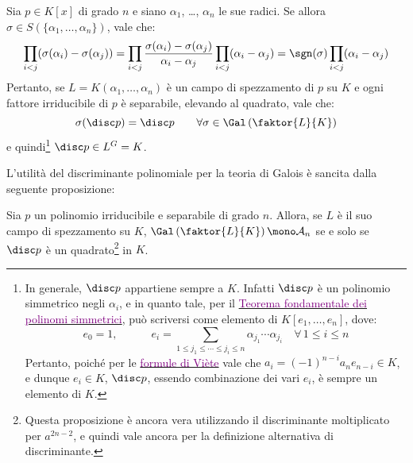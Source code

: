 \documentclass[11pt]{scrartcl}
\begin{document}
	\begin{remark}
		Sia $p \in K[x]$ di grado $n$ e siano $\alpha_1$, \ldots, $\alpha_n$ le sue radici.
		Se allora $\sigma \in S(\{\alpha_1, \ldots, \alpha_n\})$, vale che:
		\[ \prod_{i < j} (\sigma(\alpha_i) - \sigma(\alpha_j)) = \prod_{i < j} \frac{\sigma(\alpha_i) - \sigma(\alpha_j)}{\alpha_i - \alpha_j} \prod_{i < j} (\alpha_i - \alpha_j) = \sgn(\sigma) \prod_{i < j} (\alpha_i - \alpha_j)  \]
		Pertanto, se $L = K(\alpha_1, \ldots, \alpha_n)$ è un campo di spezzamento di $p$ su $K$ e
		ogni fattore irriducibile di $p$ è separabile,
		elevando al quadrato, vale che:
		\[ \sigma(\disc p) = \disc p \qquad \forall \sigma \in \Gal\left(\faktor{L}{K}\right) \]
		e quindi\footnote{
			In generale, $\disc p$ appartiene sempre a $K$. Infatti $\disc p$ è un polinomio
			simmetrico negli $\alpha_i$, e in quanto tale, per il \href{https://it.wikipedia.org/wiki/Polinomio_simmetrico\#Teorema_fondamentale_per_i_polinomi_simmetrici}{\textcolor{purple}{Teorema fondamentale dei polinomi simmetrici}}, può scriversi come elemento di $K[e_1, \ldots, e_n]$, dove:
			\[ e_0 = 1, \quad\qquad e_i = \sum_{1 \leq j_1  \leq \cdots \leq j_i \leq n } \alpha_{j_1} \cdots \alpha_{j_i} \quad \forall \, 1 \leq i \leq n \]
			Pertanto, poiché per le \href{https://it.wikipedia.org/wiki/Formule_di_Vi\%C3\%A8te}{\textcolor{purple}{formule di Viète}} vale che $a_i = (-1)^{n-i} a_n e_{n-i} \in K$, e dunque $e_i \in K$, $\disc p$, essendo combinazione dei vari $e_i$, è sempre un elemento di $K$.
		} $\disc p \in L^G = K$.
	\end{remark}
	
	L'utilità del discriminante polinomiale per la teoria di Galois è sancita dalla
	seguente proposizione:
	
	\begin{proposition}
		Sia $p$ un polinomio irriducibile e separabile di grado $n$. Allora, se $L$ è il suo
		campo di spezzamento su $K$, $\Gal\left(\faktor{L}{K}\right) \mono \mathcal{A}_n$ se e
		solo se $\disc p$ è un quadrato\footnote{
			Questa proposizione è ancora vera utilizzando il discriminante moltiplicato
			per $a^{2n-2}$, e quindi vale ancora per la definizione alternativa di
			discriminante.
		} in $K$.
	\end{proposition}
	
\end{document}
